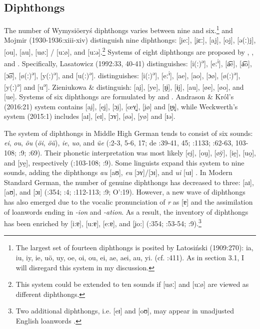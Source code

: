 \documentclass[output=paper]{langscibook}
\begin{document}
\subsection{Diphthongs}\label{sec:wymsorys:3.2}


The number of Wymysiöeryś diphthongs varies between nine and six.\footnote{The largest set of fourteen diphthongs is posited by Latosiński (1909:270): ia, iu, iy, ie, uö, uy, oe, oi, ou, ei, ae, aei, au, yi. (cf. \citealt{Wicherkiewicz2003}:411). As in section 3.1, I will disregard this system in my discussion.} \citet[12-13]{Kleczkowski1920} and Mojmir (1930-1936:xiii-xiv) distinguish nine diphthongs: [i̯eː], [i̯ɛː], [aj], [oj], [ə(ː)j], [ou], [au], [uøː] / [uːø], and [uːə].\footnote{This system could be extended to ten sounds if [uøː] and [uːø] are viewed as different diphthongs.} Systems of eight diphthongs are proposed by \citet{Lasatowicz1992}, \citet{Wicherkiewicz2003}, and \citet{ZieniukowaWicherkiewicz2001}. Specifically, Lasatowicz (1992:33, 40-41) distinguishes: [i(ː)\textsuperscript{ə}], [eː\textsuperscript{i}], [a͡e], [a͡o], [ɔ͡ø], [ø(ː)\textsuperscript{ə}], [y(ː)\textsuperscript{ə}], and [u(ː)\textsuperscript{ə}]. \citet[407-408]{Wicherkiewicz2003} distinguishes: [i(ː)\textsuperscript{ə}], [eː\textsuperscript{i}], [ae], [ao], [ɔø], [ø(ː)\textsuperscript{ə}], [y(ː)\textsuperscript{ə}] and [u\textsuperscript{ə}]. Zieniukowa \& \citet[499-500]{Wicherkiewicz2001} distinguish: [ai̯], [ye], [ɪ̯ɨ], [ɨj], [au], [øe], [øo], and [ue]. Systems of six diphthongs are formulated by \citet{AndrasonKról2016} and \citet{Weckwerth2015}. Andrason \& Król’s (2016:21) system contains [ai̯], [ei̯̯], [ɔi̯], [œʏ̯], [i̯ø] and [ɪ̯ɘ̟], while Weckwerth’s system (2015:1) includes [aɪ], [eɪ], [ɔʏ], [øə], [yø] and [ɪə].



The system of diphthongs in Middle High German tends to consist of six sounds: \textit{ei}, \textit{ou}, \textit{öu} (\textit{öi}, \textit{öü}), \textit{ie}, \textit{uo}, and \textit{üe} (\citealt{Wright1917}:2-3, 5-6, 17; de \citealt{BoorWisniewski1973}:39-41, 45; \citealt{Simmler1985}:1133; \citealt{Paul2007}:62-63, 103-108; \citealt{Hall2017}:9; \citealt{Schmidt2017}:69). Their phonetic interpretation was most likely [ei̯], [ou̯], [ø\u{y}], [ie̯], [uo̯], and [ye̯], respectively (\citealt{Paul2007}:103-108; \citealt{Hall2017}:9). Some linguists expand this system to nine sounds, adding the diphthongs \textit{au} [aʊ], \textit{eu} [ɔʏ]/[ɔɪ], and \textit{ui} [uɪ] \citep[185]{Caratini2009}. In Modern Standard German, the number of genuine diphthongs has decreased to three: [aɪ], [aʊ], and [ɔɪ] (\citealt{Eisenberg1994}:354; \citealt{DoddEtAl2003}:4; \citealt{JohnsonBraber2008}:112-113; \citealt{Fagan2009}:9; O’\citealt{BrienFagan2016}:19). However, a new wave of diphthongs has also emerged due to the vocalic pronunciation of \textit{r} as [ɐ] and the assimilation of loanwords ending in \textit{{}-ion} and \textit{{}-ation}. As a result, the inventory of diphthongs has been enriched by [i:ɐ], [u:ɐ], [e:ɐ], and [i̯̯o:] (\citealt{Eisenberg1994}:354; \citealt{Fox2005}:53-54; \citealt{Fagan2009}:9).\footnote{Two additional diphthongs, i.e. [eɪ] and [oʊ], may appear in unadjusted English loanwords \citep[73]{Caratini2009}.}
\end{document}
